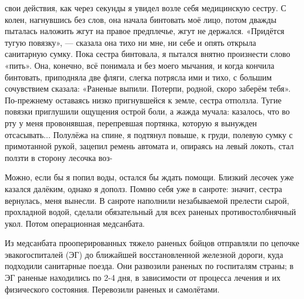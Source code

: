 \label{11-1}
свои действия, как через секунды я увидел возле себя медицинскую сестру. С колен, нагнувшись без слов, она начала бинтовать моё лицо, потом дважды пыталась наложить жгут на правое предплечье, жгут не держался. «Придётся тугую повязку», — сказала она тихо ни мне, ни себе и опять открыла санитарную сумку. Пока сестра бинтовала, я пытался внятно произнести слово «пить». Она, конечно, всё понимала и без моего мычания, и когда кончила бинтовать, приподняла две фляги, слегка потрясла ими и тихо, с большим сочувствием сказала: «Раненые выпили. Потерпи, родной, скоро заберём тебя». По-прежнему оставаясь низко пригнувшейся к земле, сестра отползла. Тугие повязки приглушили ощущения острой боли, а жажда мучала: казалось, что во рту у меня провонявшая, перепревшая портянка, которую я вынужден отсасывать... Полулёжа на спине, я подтянул повыше, к груди, полевую сумку с примотанной рукой, зацепил ремень автомата и, опираясь на левый локоть, стал ползти в сторону лесочка воз-

\label{12-1}
Можно, если бы я попил воды, остался бы ждать помощи. Близкий лесочек уже казался далёким, однако я дополз. Помню себя уже в санроте: значит, сестра вернулась, меня вынесли. В санроте наполнили незабываемой прелести сырой, прохладной водой, сделали обязательный для всех раненых противостолбнячный укол. Потом операционная медсанбата.

\label{12-2}

\label{12-3}

Из медсанбата прооперированных тяжело раненых бойцов отправляли по цепочке эвакогоспиталей (ЭГ) до ближайшей восстановленной железной дороги, куда подходили санитарные поезда. Они развозили раненых по госпиталям страны; в ЭГ раненые находились по 2-4 дня, в зависимости от процесса лечения и их физического состояния. Перевозили раненых и самолётами.

